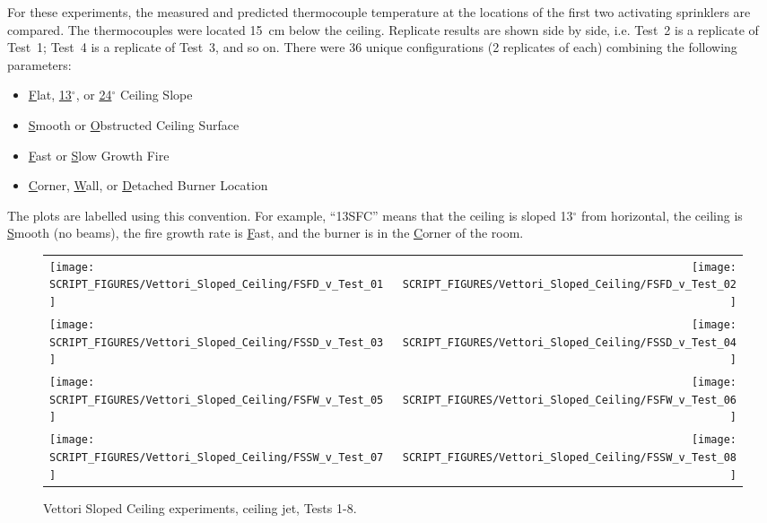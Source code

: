 For these experiments, the measured and predicted thermocouple temperature at the locations of the first two activating sprinklers are compared. The thermocouples were located 15~cm below the ceiling. Replicate results are shown side by side, i.e. Test~2 is a replicate of Test~1; Test~4 is a replicate of Test~3, and so on. There were 36 unique configurations (2 replicates of each) combining the following parameters:
\begin{itemize}
\item \underline{F}lat, \underline{13}$^\circ$, or \underline{24}$^\circ$ Ceiling Slope
\item \underline{S}mooth or \underline{O}bstructed Ceiling Surface
\item \underline{F}ast or \underline{S}low Growth Fire
\item \underline{C}orner, \underline{W}all, or \underline{D}etached Burner Location
\end{itemize}
The plots are labelled using this convention. For example, ``13SFC'' means that the ceiling is sloped 13$^\circ$ from horizontal, the ceiling is \underline{S}mooth (no beams), the fire growth rate is \underline{F}ast, and the burner is in the \underline{C}orner of the room.

\newpage

\begin{figure}[p]
\begin{tabular*}{\textwidth}{l@{\extracolsep{\fill}}r}
\texttt{[image: SCRIPT\_FIGURES/Vettori\_Sloped\_Ceiling/FSFD\_v\_Test\_01]} &
\texttt{[image: SCRIPT\_FIGURES/Vettori\_Sloped\_Ceiling/FSFD\_v\_Test\_02]} \\
\texttt{[image: SCRIPT\_FIGURES/Vettori\_Sloped\_Ceiling/FSSD\_v\_Test\_03]} &
\texttt{[image: SCRIPT\_FIGURES/Vettori\_Sloped\_Ceiling/FSSD\_v\_Test\_04]} \\
\texttt{[image: SCRIPT\_FIGURES/Vettori\_Sloped\_Ceiling/FSFW\_v\_Test\_05]} &
\texttt{[image: SCRIPT\_FIGURES/Vettori\_Sloped\_Ceiling/FSFW\_v\_Test\_06]} \\
\texttt{[image: SCRIPT\_FIGURES/Vettori\_Sloped\_Ceiling/FSSW\_v\_Test\_07]} &
\texttt{[image: SCRIPT\_FIGURES/Vettori\_Sloped\_Ceiling/FSSW\_v\_Test\_08]} \\
\end{tabular*}
\caption{Vettori Sloped Ceiling experiments, ceiling jet, Tests 1-8.}
\label{Vettori_Sloped_1}
\end{figure}

